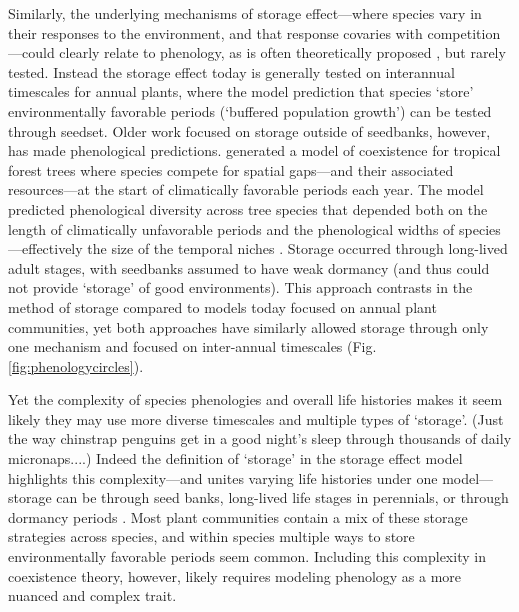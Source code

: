 \documentclass[11pt]{article}
\begin{document}
Similarly, the underlying mechanisms of storage effect---where species vary in their responses to the environment, and that response covaries with competition---could clearly relate to phenology, as is often theoretically proposed \citep{Chesson:1993gi,Chesson:2004eo}, but rarely tested. Instead the storage effect today is generally tested on interannual timescales for annual plants, where the model prediction that species `store' environmentally favorable periods (`buffered population growth') can be tested through seedset. Older work focused on storage outside of seedbanks, however, has made phenological predictions. \citet{Kubo:1996qe} generated a model of coexistence for tropical forest trees where species compete for spatial gaps---and their associated resources---at the start of climatically favorable periods each year. The model predicted phenological diversity across tree species that depended both on the length of climatically unfavorable periods and the phenological widths of species---effectively the size of the temporal niches \citep{Kubo:1996qe}. Storage occurred through long-lived adult stages, with seedbanks assumed to have weak dormancy (and thus could not provide `storage' of good environments). This approach contrasts in the method of storage compared to models today focused on annual plant communities, yet both approaches have similarly allowed storage through only one mechanism and focused on inter-annual timescales (Fig. \ref{fig:phenologycircles}).

Yet the complexity of species phenologies and overall life histories makes it seem likely they may use more diverse timescales and multiple types of `storage'. (Just the way chinstrap penguins get in a good night's sleep through thousands of daily micronaps....)  Indeed the definition of `storage' in the storage effect model highlights this complexity---and unites varying life histories under one model---storage can be through seed banks, long-lived life stages in perennials, or through dormancy periods \citep{Chesson:2000vd}. Most plant communities contain a mix of these storage strategies across species, and within species multiple ways to store environmentally favorable periods seem common. Including this complexity in coexistence theory, however, likely requires modeling phenology as a more nuanced and complex trait. %
\end{document}

